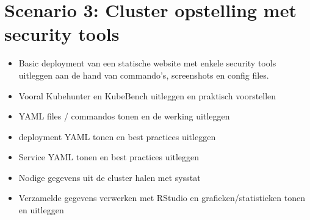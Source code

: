 \clearpage
\section{Scenario 3: Cluster opstelling met security tools}
\begin{itemize}
	\item Basic deployment van een statische website met enkele security tools uitleggen aan de hand van commando's, screenshots en config files. 
	\item Vooral Kubehunter en KubeBench uitleggen en praktisch voorstellen
	\item YAML files / commandos tonen en de werking uitleggen
	\item deployment YAML tonen en best practices uitleggen
	\item Service YAML tonen en best practices uitleggen
	\item Nodige gegevens uit de cluster halen met sysstat
	\item Verzamelde gegevens verwerken met RStudio en grafieken/statistieken tonen en uitleggen
\end{itemize}
